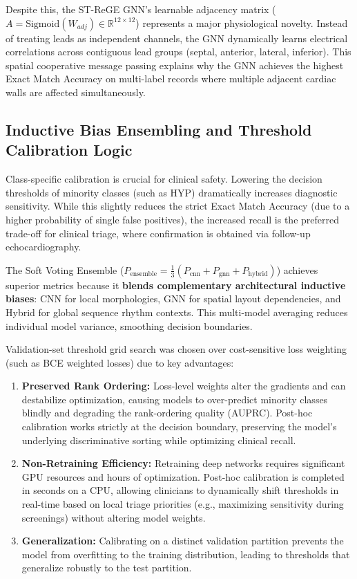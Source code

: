 \documentclass[14pt]{extarticle}
\begin{document}
Despite this, the ST-ReGE GNN's learnable adjacency matrix ($A = \text{Sigmoid}(W_{adj}) \in \mathbb{R}^{12 \times 12}$) represents a major physiological novelty. Instead of treating leads as independent channels, the GNN dynamically learns electrical correlations across contiguous lead groups (septal, anterior, lateral, inferior). This spatial cooperative message passing explains why the GNN achieves the highest Exact Match Accuracy on multi-label records where multiple adjacent cardiac walls are affected simultaneously.

\subsection{Inductive Bias Ensembling and Threshold Calibration Logic}
Class-specific calibration is crucial for clinical safety. Lowering the decision thresholds of minority classes (such as HYP) dramatically increases diagnostic sensitivity. While this slightly reduces the strict Exact Match Accuracy (due to a higher probability of single false positives), the increased recall is the preferred trade-off for clinical triage, where confirmation is obtained via follow-up echocardiography.

The Soft Voting Ensemble ($P_{\text{ensemble}} = \frac{1}{3}(P_{\text{cnn}} + P_{\text{gnn}} + P_{\text{hybrid}})$) achieves superior metrics because it \textbf{blends complementary architectural inductive biases}: CNN for local morphologies, GNN for spatial layout dependencies, and Hybrid for global sequence rhythm contexts. This multi-model averaging reduces individual model variance, smoothing decision boundaries.

Validation-set threshold grid search was chosen over cost-sensitive loss weighting (such as BCE weighted losses) due to key advantages:
\begin{enumerate}
    \item \textbf{Preserved Rank Ordering:} Loss-level weights alter the gradients and can destabilize optimization, causing models to over-predict minority classes blindly and degrading the rank-ordering quality (AUPRC). Post-hoc calibration works strictly at the decision boundary, preserving the model's underlying discriminative sorting while optimizing clinical recall.
    \item \textbf{Non-Retraining Efficiency:} Retraining deep networks requires significant GPU resources and hours of optimization. Post-hoc calibration is completed in seconds on a CPU, allowing clinicians to dynamically shift thresholds in real-time based on local triage priorities (e.g., maximizing sensitivity during screenings) without altering model weights.
    \item \textbf{Generalization:} Calibrating on a distinct validation partition prevents the model from overfitting to the training distribution, leading to thresholds that generalize robustly to the test partition.
\end{enumerate}
\end{document}
